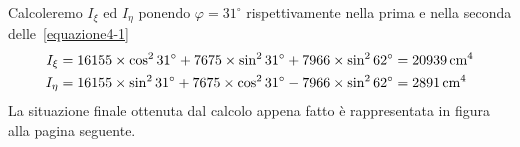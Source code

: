 Calcoleremo $I_{\xi}$ ed $I_{\eta}$ ponendo $\varphi=31^{\circ}$ rispettivamente nella prima e nella seconda delle~\eqref{equazione4-1}
\begin{align*}
I_{\xi} &= 16155\times\cos^{2}31^{\circ}+7675\times\sin^{2}31^{\circ}+7966\times\sin^{2}62^{\circ} = 20939\,\textup{cm}^4 \\
I_{\eta} &= 16155\times\sin^{2}31^{\circ}+7675\times\cos^{2}31^{\circ}-7966\times\sin^{2}62^{\circ} = 2891\,\textup{cm}^4
\end{align*}
La situazione finale ottenuta dal calcolo appena fatto è rappresentata in figura alla pagina seguente.
